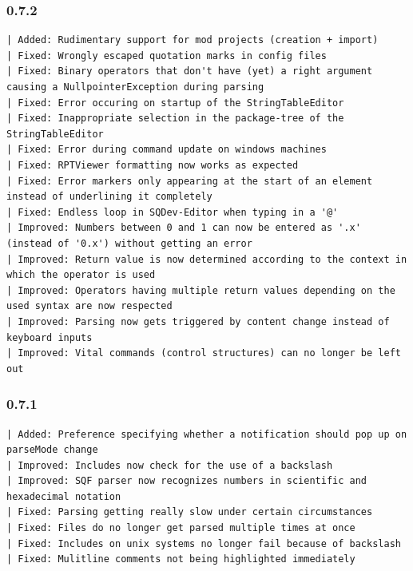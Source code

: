 \documentclass[twoside=false]{scrbook}
\begin{document}
	\subsubsection*{0.7.2}
	\begin{lstlisting}[breaklines=true]
| Added: Rudimentary support for mod projects (creation + import)
| Fixed: Wrongly escaped quotation marks in config files
| Fixed: Binary operators that don't have (yet) a right argument causing a NullpointerException during parsing
| Fixed: Error occuring on startup of the StringTableEditor
| Fixed: Inappropriate selection in the package-tree of the StringTableEditor
| Fixed: Error during command update on windows machines
| Fixed: RPTViewer formatting now works as expected
| Fixed: Error markers only appearing at the start of an element instead of underlining it completely
| Fixed: Endless loop in SQDev-Editor when typing in a '@'
| Improved: Numbers between 0 and 1 can now be entered as '.x' (instead of '0.x') without getting an error
| Improved: Return value is now determined according to the	context in which the operator is used
| Improved: Operators having multiple return values depending on the used syntax are now respected
| Improved: Parsing now gets triggered by content change instead of keyboard inputs
| Improved: Vital commands (control structures) can no longer be left out
	\end{lstlisting}
	
	\subsubsection*{0.7.1}
	\begin{lstlisting}[breaklines=true]
| Added: Preference specifying whether a notification should pop up on parseMode change
| Improved: Includes now check for the use of a backslash
| Improved: SQF parser now recognizes numbers in scientific and hexadecimal notation
| Fixed: Parsing getting really slow under certain circumstances
| Fixed: Files do no longer get parsed multiple times at once
| Fixed: Includes on unix systems no longer fail because of backslash
| Fixed: Mulitline comments not being highlighted immediately
	\end{lstlisting}
	
\end{document}
